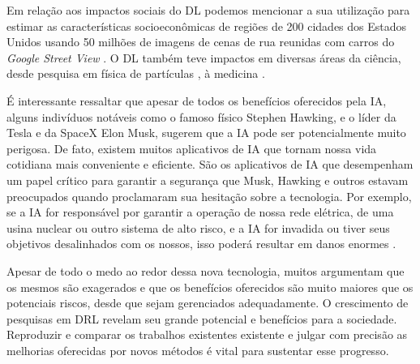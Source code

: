 Em relação aos impactos sociais do DL podemos mencionar a sua utilização para estimar as características socioeconômicas de regiões de 200 cidades dos Estados Unidos usando 50 milhões de imagens de cenas de rua reunidas com carros do \textit{Google Street View} \cite{Gebru13108}. O DL também teve impactos em diversas áreas da ciência, desde pesquisa em física de partículas \cite{baldi:s:w:2015}, à medicina \cite{nassif:speech-rec:2019}.

É interessante ressaltar que apesar de todos os benefícios oferecidos pela IA, alguns indivíduos notáveis como o famoso físico Stephen Hawking, e o líder da Tesla e da SpaceX Elon Musk, sugerem que a IA pode ser potencialmente muito perigosa. De fato, existem muitos aplicativos de IA que tornam nossa vida cotidiana mais conveniente e eficiente. São os aplicativos de IA que desempenham um papel crítico para garantir a segurança que Musk, Hawking e outros estavam preocupados quando proclamaram sua hesitação sobre a tecnologia. Por exemplo, se a IA for responsável por garantir a operação de nossa rede elétrica, de uma usina nuclear ou outro sistema de alto risco, e a IA for invadida ou tiver seus objetivos desalinhados com os nossos, isso poderá resultar em danos enormes \cite{Marr:AI-Danger}. 

Apesar de todo o medo ao redor dessa nova tecnologia, muitos argumentam que os mesmos são exagerados e que os benefícios oferecidos são muito maiores que os potenciais riscos, desde que sejam gerenciados adequadamente. O crescimento de pesquisas em DRL revelam seu grande potencial e benefícios para a sociedade. Reproduzir e comparar os trabalhos existentes existente e julgar com precisão as melhorias oferecidas por novos métodos é vital para sustentar esse progresso. 


